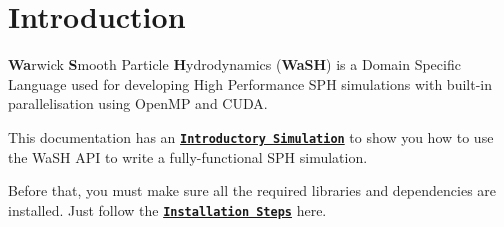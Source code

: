 \hypertarget{index_intro_sec}{}\section{Introduction}\label{index_intro_sec}
{\bfseries Wa}rwick {\bfseries S}mooth Particle {\bfseries H}ydrodynamics ({\bfseries Wa\+SH}) is a Domain Specific Language used for developing High Performance S\+PH simulations with built-\/in parallelisation using Open\+MP and C\+U\+DA.

This documentation has an \href{md_markdown_example_usecase.html}{\tt {\bfseries Introductory Simulation}} to show you how to use the Wa\+SH A\+PI to write a fully-\/functional S\+PH simulation.

Before that, you must make sure all the required libraries and dependencies are installed. Just follow the \href{md_markdown_installation.html}{\tt {\bfseries Installation Steps}} here. 
